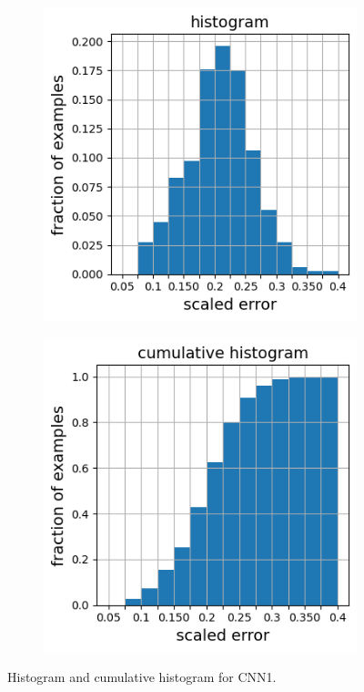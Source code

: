 \documentclass[12pt]{article}
\newcommand{\nhghalfwidth}{0.48\linewidth}
\newcommand{\nhgtotalheight}{4cm}
\begin{document}
\begin{figure}[!h]
\captionsetup[subfigure]{justification=centering}
  \centering
  \begin{subfigure}[c]{\nhghalfwidth}
    \centering
    \includegraphics[totalheight=\nhgtotalheight]{Figures/Results1/histogram.png}
  \end{subfigure}
%  
  \begin{subfigure}[c]{\nhghalfwidth}
    \centering
    \includegraphics[totalheight=\nhgtotalheight]{Figures/Results1/cumulative.png}
  \end{subfigure}
  \caption{\label{fig:cnn1histo} Histogram and cumulative histogram for CNN1.}
\end{figure}
%
\end{document}
